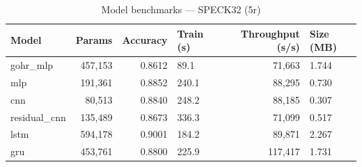 \begin{table}[h]
\centering
\caption{Model benchmarks — SPECK32 (5r)}
\begin{tabular}{lrrlrl}
\toprule
Model & Params & Accuracy & Train (s) & Throughput (s/s) & Size (MB) \\
\midrule
gohr_mlp & 457,153 & 0.8612 & 89.1 & 71,663 & 1.744 \\
mlp & 191,361 & 0.8852 & 240.1 & 88,295 & 0.730 \\
cnn & 80,513 & 0.8840 & 248.2 & 88,185 & 0.307 \\
residual_cnn & 135,489 & 0.8673 & 336.3 & 71,099 & 0.517 \\
lstm & 594,178 & 0.9001 & 184.2 & 89,871 & 2.267 \\
gru & 453,761 & 0.8800 & 225.9 & 117,417 & 1.731 \\
\bottomrule
\end{tabular}
\end{table}